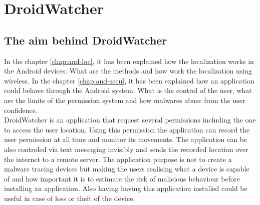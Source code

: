 
\chapter{DroidWatcher}
\label{chap:droidwatcher}




\section{The aim behind DroidWatcher}

In the chapter \ref{chap:and-loc}, it has been explained how the localization works in the Android devices.
What are the methods and how work the localization using wireless.
In the chapter \ref{chap:and-secu}, it has been explained how an application could behave through the Android system.
What is the control of the user, what are the limits of the permission system and how malwares abuse from the user confidence.\\

DroidWatcher is an application that request several permissions including the one to access the user location.
Using this permission the application can record the user permission at all time and monitor its movements.
The application can be also controled via text messaging invisibly and sends the recorded location over the internet to a remote server.
The application purpose is not to create a malware tracing devices but making the users realising what a device is capable of and how important it is to estimate the risk of malicious behaviour before installing an application.
Also having having this application installed could be useful in case of loss or theft of the device.\\


